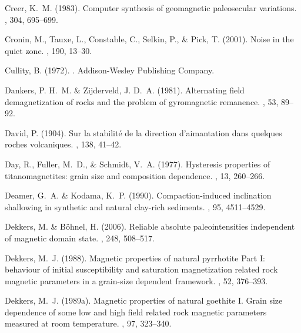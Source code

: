 \documentclass[11pt]{book}
\begin{document}
\begin{thebibliography}{}
Creer, K.~M. (1983).
\newblock Computer synthesis of geomagnetic paleosecular variations.
, 304, 695--699.

Cronin, M., Tauxe, L., Constable, C., Selkin, P., \& Pick, T. (2001).
\newblock Noise in the quiet zone.
, 190, 13--30.

Cullity, B. (1972).
.
\newblock Addison-Wesley Publishing Company.

Dankers, P. H.~M. \& Zijderveld, J. D.~A. (1981).
\newblock Alternating field demagnetization of rocks and the problem of
  gyromagnetic remanence.
, 53, 89--92.

David, P. (1904).
\newblock Sur la stabilit\'e de la direction d'aimantation dans quelques roches
  volcaniques.
, 138, 41--42.

Day, R., Fuller, M.~D., \& Schmidt, V.~A. (1977).
\newblock Hysteresis properties of titanomagnetites: grain size and composition
  dependence.
, 13, 260--266.

Deamer, G.~A. \& Kodama, K.~P. (1990).
\newblock Compaction-induced inclination shallowing in synthetic and natural
  clay-rich sediments.
, 95, 4511--4529.

Dekkers, M. \& B\"ohnel, H. (2006).
\newblock Reliable absolute paleointensities independent of magnetic domain
  state.
, 248, 508--517.

Dekkers, M.~J. (1988).
\newblock Magnetic properties of natural pyrrhotite Part {I}: behaviour of
  initial susceptibility and saturation magnetization related rock magnetic
  parameters in a grain-size dependent framework.
, 52, 376--393.

Dekkers, M.~J. (1989a).
\newblock Magnetic properties of natural goethite {I}. Grain size dependence of
  some low and high field related rock magnetic parameters measured at room
  temperature.
, 97, 323--340.


\end{thebibliography}
\end{document}
